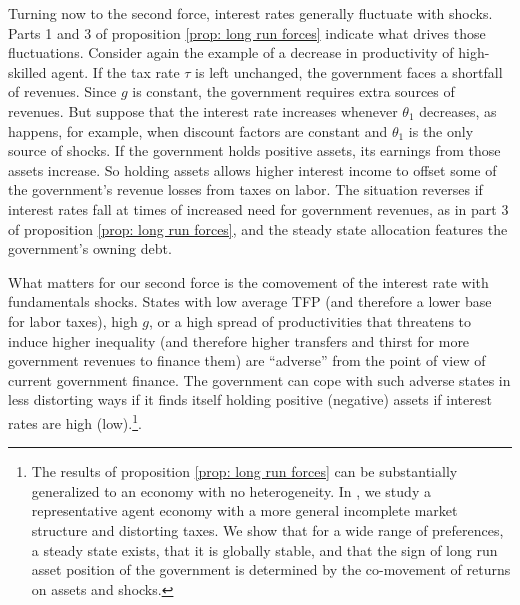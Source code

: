 \documentclass[thmsb,11pt]{article}
\begin{document}

Turning now to the second force,  interest rates generally fluctuate
with  shocks.  Parts 1 and 3 of  proposition \ref{prop: long run forces} indicate what drives those  fluctuations. Consider again the example of a
decrease in productivity of high-skilled agent. If the  tax rate  $\tau $ is left unchanged,
the government faces a shortfall of revenues. Since
$g$ is constant, the
government requires  extra sources of revenues. But  suppose that
the interest rate increases whenever $\theta_1 $ decreases, as happens, for
example, when  discount factors are
constant and $\theta_1 $ is the only source of shocks. If the government holds positive assets, its earnings from those assets increase.
 So holding assets allows higher interest income
 to offset some of the government's revenue losses from taxes on labor.  The situation reverses if interest rates fall at
times of increased need for government revenues, as in
 part 3 of  proposition \ref{prop: long run forces}, and the steady state allocation features the government's owning debt.


 What matters for our second force is the comovement of the interest rate with fundamentals shocks. States with low average TFP (and therefore a lower base for labor taxes), high $g$, or a high spread of productivities that threatens to induce higher inequality (and therefore higher  transfers and thirst for more  government  revenues to finance them) are ``adverse'' from the point of view of current government finance. The government can cope with such adverse states in less distorting ways if it finds itself holding positive (negative) assets if interest rates are  high (low).\footnote{The results of proposition \ref{prop: long run forces} can be substantially generalized to an economy with no heterogeneity. In \citet{BEGS2}, we study a representative agent economy with a more general incomplete market structure and distorting taxes. We show that for a wide range of preferences, a steady state exists, that it is globally stable, and that the sign of long run asset position of the government is determined by
the co-movement of returns on assets and shocks.}.
\end{document}
